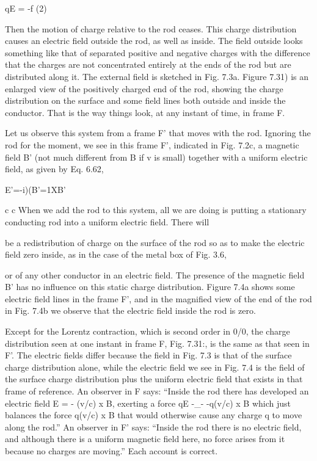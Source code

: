 qE = -f (2)

Then the motion of charge relative to the rod ceases. This charge
distribution causes an electric field outside the rod, as well as inside.
The field outside looks something like that of separated positive and
negative charges with the difference that the charges are not concentrated
entirely at the ends of the rod but are distributed along it. The
external field is sketched in Fig. 7.3a. Figure 7.31) is an enlarged view
of the positively charged end of the rod, showing the charge distribution
on the surface and some field lines both outside and inside the
conductor. That is the way things look, at any instant of time, in
frame F.

Let us observe this system from a frame F' that moves with the rod.
Ignoring the rod for the moment, we see in this frame F', indicated in
Fig. 7.2c, a magnetic field B' (not much different from B if v is small)
together with a uniform electric field, as given by Eq. 6.62,

E'=-i)(B'=1XB' 

c c
When we add the rod to this system, all we are doing is putting a
stationary conducting rod into a uniform electric field. There will

be a redistribution of charge on the surface of the rod so as to make
the electric field zero inside, as in the case of the metal box of Fig. 3.6,

or of any other conductor in an electric field. The presence of the
magnetic field B' has no influence on this static charge distribution.
Figure 7.4a shows some electric field lines in the frame F', and in the
magnified view of the end of the rod in Fig. 7.4b we observe that the
electric field inside the rod is zero.

Except for the Lorentz contraction, which is second order in 0/0,
the charge distribution seen at one instant in frame F, Fig. 7.31:, is the
same as that seen in F'. The electric fields differ because the field in
Fig. 7.3 is that of the surface charge distribution alone, while the
electric field we see in Fig. 7.4 is the field of the surface charge
distribution plus the uniform electric field that exists in that frame
of reference. An observer in F says: ``Inside the rod there has developed
an electric field E = - (v/c) x B, exerting a force qE -_-
-q(v/c) x B which just balances the force q(v/c) x B that would
otherwise cause any charge q to move along the rod.'' An observer
in F' says: ``Inside the rod there is no electric field, and although there
is a uniform magnetic field here, no force arises from it because no
charges are moving.'' Each account is correct.

